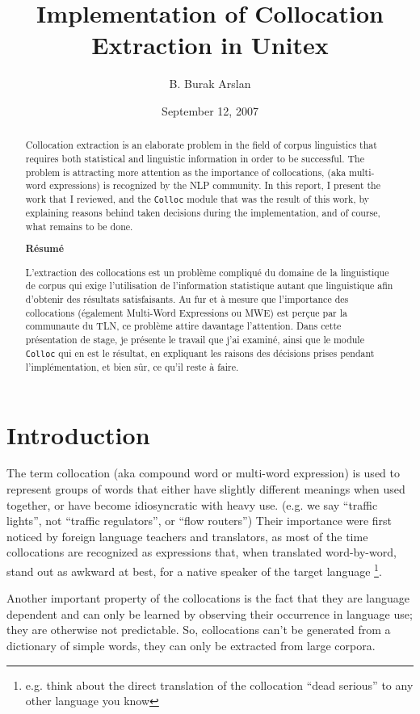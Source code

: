 \documentclass[a4paper,12pt,oneside]{article}
\title{Implementation of Collocation Extraction in Unitex}
\author{B. Burak Arslan}
\date{September 12, 2007}
\begin{document}
\maketitle
\begin{abstract}
Collocation extraction is an elaborate problem in the field of corpus linguistics that requires both statistical and linguistic information in order to be successful. The problem is attracting more attention as the importance of collocations, (aka multi-word expressions) is recognized by the NLP community. In this report, I present the work that I reviewed, and the \texttt{Colloc} module that was the result of this work, by explaining reasons behind taken decisions during the implementation, and of course, what remains to be done.

\begin{center}
\textbf{Résumé}
\end{center}

L'extraction des collocations est un problème compliqué du domaine de la linguistique de corpus qui exige l'utilisation de l'information statistique autant que linguistique afin d'obtenir des résultats satisfaisants. Au fur et à mesure que l'importance des collocations (également Multi-Word Expressions ou MWE) est perçue par la communaute du TLN, ce problème attire davantage l'attention. Dans cette présentation de stage, je présente le travail que j'ai examiné, ainsi que le module \texttt{Colloc} qui en est le résultat, en expliquant les raisons des décisions prises pendant l'implémentation, et bien sûr, ce qu'il reste à faire.
\end{abstract}

\section{Introduction}
The term collocation (aka compound word or multi-word expression) is used to represent groups of words that either have slightly different meanings when used together, or have become idiosyncratic with heavy use. 
(e.g. we say ``traffic lights'', not ``traffic regulators'', or ``flow routers'')
Their importance were first noticed by foreign language teachers and translators, as most of the time collocations are recognized as expressions that, when translated word-by-word, stand out as awkward at best, for a native speaker of the target language
\footnote{e.g. think about the direct translation of the collocation ``dead serious'' to any other language you know}. 

Another important property of the collocations is the fact that they are language dependent and can only be learned by observing their occurrence in language use; they are otherwise not predictable\cite{seretan2003}. So, collocations can't be generated from a dictionary of simple words, they can only be extracted from large corpora.
\end{document}
